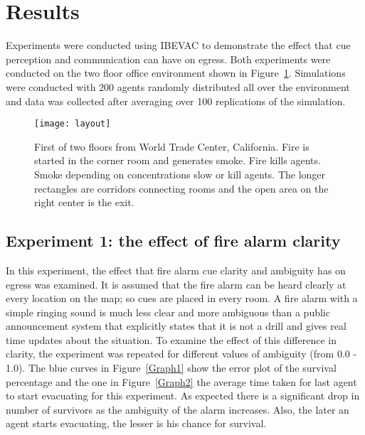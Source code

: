 \section{Results}
\label{PreEvac:Results}

Experiments were conducted using IBEVAC to demonstrate the effect that cue perception and communication can have on egress. Both experiments were conducted on the two floor office environment shown in Figure~\ref{fig:layout}. Simulations were conducted with 200 agents randomly distributed all over the environment and data was collected after averaging over 100 replications of the simulation.

\begin{figure}[!tb]
\centering
\texttt{[image: layout]}
\caption[The Environment Layout]{First of two floors from World Trade Center, California. Fire is started in the corner room and generates smoke. Fire kills agents. Smoke depending on concentrations slow or kill agents. The longer rectangles are corridors connecting rooms and the open area on the right center is the exit.}
\label{fig:layout}
\end{figure}


\subsection{Experiment 1: the effect of fire alarm clarity}
\label{PreEvac:experiment1}

In this experiment, the effect that fire alarm cue clarity and ambiguity has on egress was examined. It is assumed that the fire alarm can be heard clearly at every location on the map; so cues are placed in every room. A fire alarm with a simple ringing sound is much less clear and more ambiguous than a public announcement system that explicitly states that it is not a drill and gives real time updates about the situation. To examine the effect of this difference in clarity, the experiment was repeated for different values of ambiguity (from 0.0 - 1.0). The blue curves in Figure~\ref{Graph1} show the error plot of the survival percentage and the one in Figure~\ref{Graph2} the average time taken for last agent to start evacuating for this experiment. As expected there is a significant drop in number of survivors as the ambiguity of the alarm increases. Also, the later an agent starts evacuating, the lesser is his chance for survival.



